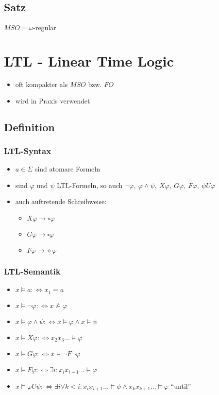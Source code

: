     \subsection{Satz}
        $MSO=\omega$-regulär
\section{LTL - Linear Time Logic}
    \begin{itemize}
        \item oft kompakter als $MSO$ bzw. $FO$
        \item wird in Praxis verwendet
    \end{itemize}
    \subsection{Definition}
        \subsubsection{LTL-Syntax}
            \begin{itemize}
                \item $a\in\Sigma$ sind atomare Formeln
                \item sind $\varphi$ und $\psi$ LTL-Formeln, so auch $\neg\varphi,\ \varphi\wedge\psi,\ X\varphi,\ G\varphi,\ F\varphi,\ \psi U\varphi$
                \item auch auftretende Schreibweise:\\
                    \begin{itemize}
                        \item $X\varphi\rightarrow\circ\varphi$
                        \item $G\varphi\rightarrow\square\varphi$
                        \item $F\varphi\rightarrow\diamond\varphi$
                    \end{itemize}
            \end{itemize}
        \subsubsection{LTL-Semantik}
            \begin{itemize}
                \item $x\models a:\Leftrightarrow x_1=a$
                \item $x\models \neg\varphi:\Leftrightarrow x\not\models\varphi$
                \item $x\models \varphi\wedge\psi:\Leftrightarrow x\models\varphi\wedge x\models\psi$
                \item $x\models X\varphi:\Leftrightarrow x_2x_3\dots\models\varphi$
                \item $x\models G\varphi:\Leftrightarrow x\models\neg F\neg\varphi$
                \item $x\models F\varphi:\Leftrightarrow \exists i:x_ix_{i+1}\dots\models\varphi$
                \item $x\models \varphi U\psi:\Leftrightarrow\exists i\forall k<i: x_ix_{i+1}\dots\models\psi\wedge x_kx_{k+1}\dots\models\varphi$ ``until''
            \end{itemize}
